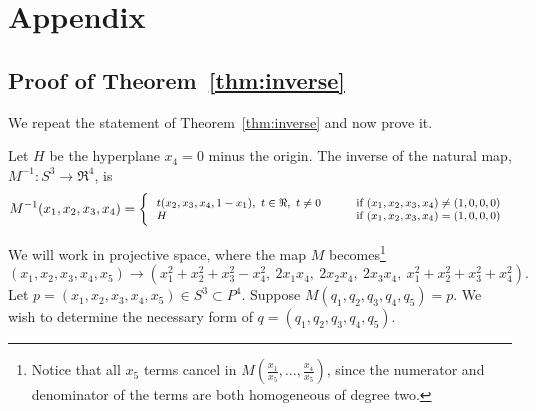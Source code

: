 \section{Appendix}
\label{appendix}

\subsection{Proof of Theorem~\ref{thm:inverse}}

We repeat the statement of Theorem~\ref{thm:inverse} and now prove it.

\begin{theorem}
Let $H$ be the hyperplane $x_4 = 0$ minus the origin.
The inverse of the natural map, $M^{-1}: S^3 \rightarrow \Re^4$, is
\[ 
\footnotesize{
	M^{-1}(x_1,x_2,x_3,x_4) =
	\left\{ 
	\begin{tabular}{ll}
		$t(x_2,x_3,x_4,1-x_1),\ t \in \Re,\ t \neq 0 \hspace{.2in}$
		  & $\mbox{if } (x_1,x_2,x_3,x_4) \neq (1,0,0,0)$\\
		$H$ & $\mbox{if } (x_1,x_2,x_3,x_4) = (1,0,0,0)$
	\end{tabular}
	\right.
}
\]
\end{theorem}
\prf 
We will work in projective space, where the map $M$ becomes\footnote{Notice 
    that all $x_5$ terms cancel in $M(\frac{x_1}{x_5},\ldots,\frac{x_4}{x_5})$,
    since the numerator and denominator of the terms are both homogeneous of 
    degree two.}
\begin{equation}
\label{eq:proj}
	 (x_1,x_2,x_3,x_4,x_5) \rightarrow
	 (x_1^2 + x_2^2 + x_3^2 - x_4^2,\ 
	 2x_1 x_4,\ 2x_2 x_4,\ 2x_3 x_4,\ 
	 x_1^2 + x_2^2 + x_3^2 + x_4^2).
\end{equation}
Let $p = (x_1,x_2,x_3,x_4,x_5) \in S^3 \subset P^4$.
Suppose $M(q_1,q_2,q_3,q_4,q_5) = p$.
We wish to determine the necessary form of $q = (q_1,q_2,q_3,q_4,q_5)$.

